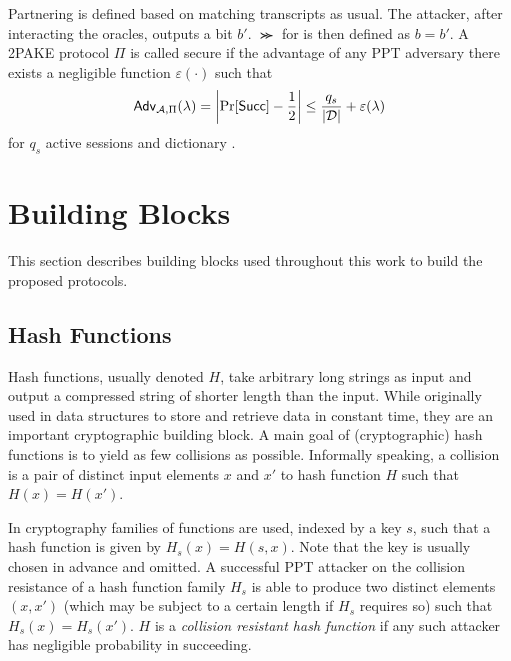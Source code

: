 \noindent
Partnering is defined based on matching transcripts as usual.
The attacker, after interacting the oracles, outputs a bit $b'$.
$\Succ$ for \cA is then defined as $b=b'$.
A \ac{2PAKE} protocol $\Pi$ is called secure if the advantage of any \ac{PPT} adversary \cA there exists a negligible function $\varepsilon(\cdot)$ such that 
\[
  \mathsf{Adv}_{\mathcal{A},\Pi}(\lambda) = \left| \Pr[\mathsf{Succ}] - \frac12 \right| \leq \frac{q_s}{|\mathcal{D}|} + \varepsilon(\lambda)
\]
for $q_s$ active sessions and dictionary \cD.

\section{Building Blocks}
This section describes building blocks used throughout this work to build the proposed protocols.


\subsection{Hash Functions}
Hash functions, usually denoted $H$, take arbitrary long strings as input and output a compressed string of shorter length than the input.
While originally used in data structures to store and retrieve data in constant time, they are an important cryptographic building block.
A main goal of (cryptographic) hash functions is to yield as few collisions as possible.
Informally speaking, a collision is a pair of distinct input elements $x$ and $x'$ to hash function $H$ such that $H(x)=H(x')$.

In cryptography families of functions are used, indexed by a key $s$, such that a hash function is given by $H_s(x)=H(s, x)$.
Note that the key is usually chosen in advance and omitted.
A successful \ac{PPT} attacker on the collision resistance of a hash function family $H_s$ is able to produce two distinct elements $(x,x')$ (which may be subject to a certain length if $H_s$ requires so) such that $H_s(x)=H_s(x')$.
$H$ is a \emph{collision resistant hash function} if any such attacker has negligible probability in succeeding.


